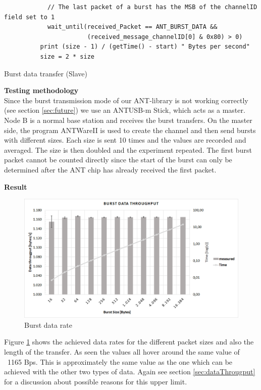 \begin{description}
\begin{code}[H]
\begin{verbatim}
		    // The last packet of a burst has the MSB of the channelID field set to 1
		    wait_until(received_Packet == ANT_BURST_DATA && 
		               (received_message_channelID[0] & 0x80) > 0)		    
		  print (size - 1) / (getTime() - start) " Bytes per second"
		  size = 2 * size
		\end{verbatim}
		\caption{Burst data transfer (Slave)}\label{lst:sExp5}
	\end{code}
	\item{\textbf{Testing methodology}} \hfill \\ Since the burst transmission mode of our ANT-library is not working correctly (see section \ref{sec:future}) we use an ANTUSB-m Stick, which acts as a master. Node B is a normal base station and receives the burst transfers. On the master side, the program ANTWareII \cite{ANTwareII} is used to create the channel and then send bursts with different sizes. Each size is sent 10 times and the values are recorded and averaged. The size is then doubled and the experiment repeated. The first burst packet cannot be counted directly since the start of the burst can only be determined after the ANT chip has already received the first packet.
	\newpage
	\item{\textbf{Result}} \hfill \\ 
	\begin{figure}[H]
		\centering
		\includegraphics[scale=0.5]{content/images/exp5.png}
		\caption{Burst data rate}\label{fig:exp5}
	\end{figure}
	Figure \ref{fig:exp5} shows the achieved data rates for the different packet sizes and also the length of the transfer. As seen the values all hover around the same value of ~1165 Bps. This is approximately the same value as the one which can be achieved with the other two types of data.
	Again see section \ref{sec:dataThrougput} for a discussion about possible reasons for this upper limit. 
\end{description}
\newpage

